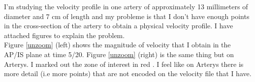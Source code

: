 \documentclass{config}
\begin{document}

I’m studying the velocity profile in one artery of approximately 13 millimeters of diameter and 7 cm of length and my probleme is that I don’t have enough points in the cross-section of the artery to obtain a physical velocity profile. I have attached figures to explain the problem. \\

Figure \ref{unzoom} (left) shows the magnitude of velocity that I obtain in the AP/IS plane at time 5/20. Figure \ref{unzoom} (right) is the same thing but on Arterys. I marked out the zone of interest in red . I feel like on Arterys there is more detail (i.e more points) that are not encoded on the velocity file that I have.
\end{document}
